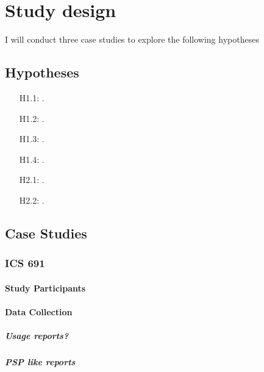 
\chapter{Study design}
\label{sec:experiment}

I will conduct three case studies to explore the following hypotheses

\section{Hypotheses}
\begin{enumerate}
\item[H1.1:]{.}
\item[H1.2:]{.}
\item[H1.3:]{.}
\item[H1.4:]{.}
\item[H2.1:]{.}
\item[H2.2:]{.}
\end{enumerate}

\section{Case Studies}

\subsection{ICS 691}
\subsubsection{Study Participants}
\subsubsection{Data Collection}
\paragraph{Usage reports?}
\paragraph{PSP like reports}
